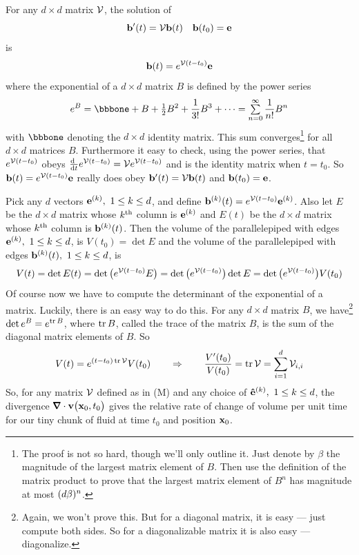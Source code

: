 \begin{eg}
             \label{eg:flowExpandC}
For any $d\times d$ matrix  $\mathcal{V}$, the solution of 
\begin{equation*}
\mathbf{b}'(t)=\mathcal{V}\mathbf{b}(t)\quad \mathbf{b}(t_0)=\mathbf{e}
\end{equation*}
is
\begin{equation*}
\mathbf{b}(t)=e^{\mathcal{V} (t-t_0)}\mathbf{e}
\end{equation*}
where the exponential of a $d\times d$ matrix $B$ is defined by
the power series
\begin{equation*}
e^B=\bbbone+B+\half B^2+\frac{1}{3!}B^3+\cdots=\smsum_{n=0}^\infty \frac{1}{n!}B^n
\end{equation*}
with $\bbbone$ denoting the $d\times d$ identity matrix.
This sum converges\footnote{The proof is not so hard, though we'll only
outline it. Just denote by $\beta$ the magnitude of the largest matrix 
element of $B$.  Then use the definition of the matrix product to prove that
the largest matrix element of $B^n$ has magnitude at most $(d\beta)^n$.} 
for all $d\times d$ matrices $B$. Furthermore it easy
to check, using the power series, that $e^{\mathcal{V} (t-t_0)}$ 
obeys $\diff{\hfill}{t}e^{\cV (t-t_0)}=\cV e^{\cV (t-t_0)}$ 
and is the identity matrix when $t=t_0$. So 
$\mathbf{b}(t)=e^{\mathcal{V} (t-t_0)}\mathbf{e}$ really does obey 
$\mathbf{b}'(t)=\mathcal{V}\mathbf{b}(t)$ and $\mathbf{b}(t_0)=\mathbf{e}$. 

Pick any $d$ vectors $\mathbf{e}^{(k)},\ 1\le k\le d$, and 
define $\mathbf{b}^{(k)}(t)=e^{\mathcal{V} (t-t_0)}\mathbf{e}^{(k)}$. Also let $E$ be the $d\times d$ matrix
whose $k^{\rm th}$ column is $\mathbf{e}^{(k)}$ and $E(t)$  be the $d\times d$ matrix
whose $k^{\rm th}$ column is $\mathbf{b}^{(k)}(t)$. Then the volume of the parallelepiped
with edges $\mathbf{e}^{(k)},\ 1\le k\le d$, is $V(t_0)=\det E$ and the volume of the 
parallelepiped with edges $\mathbf{b}^{(k)}(t),\ 1\le k\le d$, is 
\begin{equation*}
V(t)=\det E(t)=\det\big(e^{\mathcal{V} (t-t_0)}E\big)
=\det\big(e^{\mathcal{V} (t-t_0)}\big)\det E
=\det\big(e^{\mathcal{V} (t-t_0)}\big)V(t_0)
\end{equation*}
Of course now we have to compute the determinant of the exponential of a matrix.
Luckily, there is an easy way to do this.
For any $d\times d$ matrix $B$, we have\footnote{Again, we won't prove this. 
But for a diagonal matrix, it is easy --- just compute both sides. So for 
a diagonalizable matrix it is also easy --- diagonalize.}
$\det e^B=e^{\mathop{\rm tr} B}$, where $\mathop{\rm tr} B$, called the trace of the matrix $B$, is the sum of the diagonal matrix elements of $B$. So 
\begin{equation*}
V(t)=e^{(t-t_0)\mathop{\rm tr} \mathcal{V} }V(t_0)\qquad\Rightarrow\qquad
\frac{V'(t_0)}{V(t_0)}=\mathop{\rm tr} \mathcal{V}=\sum_{i=1}^d \mathcal{V}_{i,i}
\end{equation*}
So, for any matrix $\mathcal{V}$ defined as in (M)  and any choice of 
$\mathbf{\hat e}^{(k)},\ 1\le k\le d$, the divergence 
$\vnabla\cdot\vv\big(\vx_0,t_0\big)$ gives the relative rate of change
of volume per unit time for our tiny chunk of fluid at time $t_0$ and position
$\mathbf{x}_0$.
\end{eg}

